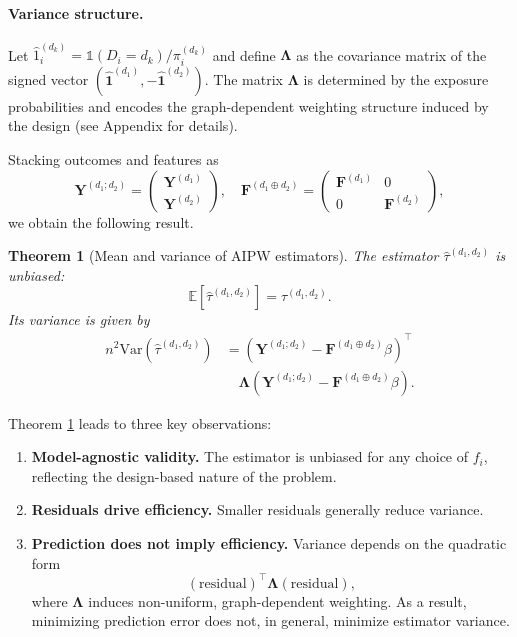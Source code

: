 \documentclass[twoside,letterpaper]{article}
\newcommand{\mathbbm}[1]{\mathds{#1}}
\theoremstyle{plain}
\newtheorem{theorem}{Theorem}[section]
\theoremstyle{definition}
\theoremstyle{remark}
\newcommand{\E}{\mathbb{E}}
\newcommand{\Var}{\mathrm{Var}}
\newcommand{\bY}{\boldsymbol{Y}}
\newcommand{\bF}{\boldsymbol{F}}
\newcommand{\bLambda}{\boldsymbol{\Lambda}}
\newcommand{\indicator}{\mathbbm{1}}
\newcommand{\bOne}{\boldsymbol{1}}
\newcommand{\bFaug}{\bF^{(d_1\oplus d_2)}}
\begin{document}
\paragraph{Variance structure.}
Let $\hat{1}_i^{(d_k)} = \indicator(D_i=d_k)/\pi_i^{(d_k)}$ and define $\bLambda$ as the covariance matrix of the signed vector $(\hat{\bOne}^{(d_1)}, -\hat{\bOne}^{(d_2)})$. The matrix $\bLambda$ is determined by the exposure probabilities and encodes the graph-dependent weighting structure induced by the design (see Appendix for details).

Stacking outcomes and features as
\[
\bY^{(d_1;d_2)} = 
\begin{pmatrix}
\bY^{(d_1)} \\
\bY^{(d_2)}
\end{pmatrix}, \quad
\bFaug =
\begin{pmatrix}
\bF^{(d_1)} & 0 \\
0 & \bF^{(d_2)}
\end{pmatrix},
\]
we obtain the following result.

\begin{theorem}[Mean and variance of AIPW estimators]\label{thm:mean_variance}
The estimator $\hat\tau^{(d_1,d_2)}$ is unbiased:
\[
\E[\hat\tau^{(d_1,d_2)}] = \tau^{(d_1,d_2)}.
\]
Its variance is given by
\[
\begin{aligned}
n^2 \Var(\hat\tau^{(d_1,d_2)}) &=
(\bY^{(d_1;d_2)} - \bFaug \beta)^\top \\
&\quad \bLambda
(\bY^{(d_1;d_2)} - \bFaug \beta).
\end{aligned}
\]
\end{theorem}

Theorem \ref{thm:mean_variance} leads to three key observations:

\begin{enumerate}[label=(\roman*)]
\item \textbf{Model-agnostic validity.} The estimator is unbiased for any choice of $f_i$, reflecting the design-based nature of the problem.

\item \textbf{Residuals drive efficiency.} Smaller residuals generally reduce variance.

\item \textbf{Prediction does not imply efficiency.} Variance depends on the quadratic form
\[
(\text{residual})^\top \bLambda (\text{residual}),
\]
where $\bLambda$ induces non-uniform, graph-dependent weighting. As a result, minimizing prediction error does not, in general, minimize estimator variance.
\end{enumerate}
\end{document}
